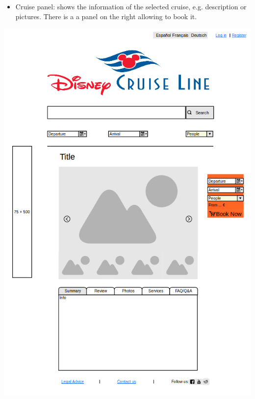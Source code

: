 \documentclass[11pt]{article}
\begin{document}
	\begin{qn}
		\begin{itemize}
			\item Cruise panel: shows the information of the selected cruise, e.g. description or pictures. There is a a panel on the right allowing to book it.
		\end{itemize}
		\begin{center}
			\begin{minipage}{0.5\linewidth}
				\includegraphics[width=\linewidth]{images/mockup3.png}
				\label{fig:mockup3}
			\end{minipage}
		\end{center}
	\end{qn}
\end{document}
